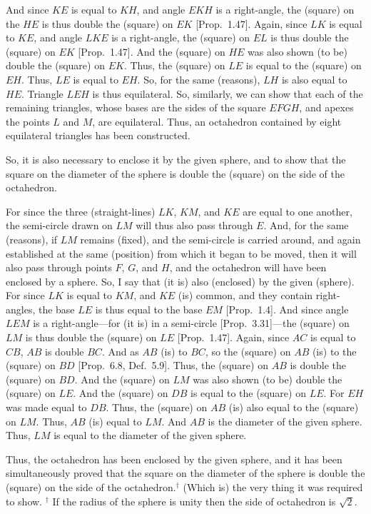 \epsfysize=3.25in
\centerline{}

And since  $KE$ is equal to $KH$, and angle $EKH$ is a right-angle, 
the (square) on the  $HE$ is thus double the (square) on $EK$ [Prop.~1.47].
Again, since $LK$ is equal to $KE$, and angle $LKE$
is a right-angle, the (square) on $EL$ is thus double the (square) on
$EK$ [Prop.~1.47]. And the (square) on $HE$ was also shown (to be)
double the (square) on $EK$.  Thus, the (square) on $LE$
is equal to the (square) on $EH$. Thus, $LE$ is equal to $EH$. So,
for the same (reasons), $LH$ is also equal to $HE$. Triangle
$LEH$ is thus equilateral. So, similarly, we can show that each of
the remaining triangles, whose bases are the sides of the
square $EFGH$, and apexes the points $L$ and $M$, are equilateral.
Thus, an octahedron contained by eight
equilateral triangles has been constructed.

So, it is also necessary to enclose it by the given sphere, and to show that the
square on the diameter of the sphere is double the (square) on the
side of the octahedron.

For since the three (straight-lines) $LK$, $KM$, and $KE$ are equal
to one another, the semi-circle drawn on $LM$ will thus also pass
through $E$. And, for the same (reasons), if $LM$ remains (fixed), and the semi-circle is carried around, and again established at the same
(position) from which it began to be moved, then it will also pass
through points $F$, $G$, and $H$, and the octahedron will have been
enclosed by a sphere. So, I say that (it is) also (enclosed)
by the given (sphere). For since $LK$ is equal to $KM$, and $KE$
(is) common, and they contain right-angles, the base
$LE$ is thus equal to the base $EM$ [Prop.~1.4]. And since angle $LEM$
is a right-angle---for (it is) in a semi-circle [Prop.~3.31]---the
(square) on $LM$ is thus double the (square) on $LE$ [Prop.~1.47]. 
Again, since $AC$ is equal to $CB$, $AB$ is double $BC$. 
And as $AB$ (is) to $BC$, so the (square) on $AB$ (is) to the
(square) on $BD$ [Prop.~6.8, Def.~5.9]. Thus, the (square) on 
$AB$ is double the (square) on $BD$. And the (square) on $LM$
was also shown (to be) double the (square) on $LE$. And the (square)
on $DB$ is equal to the (square) on $LE$. For $EH$ was made equal
to $DB$. Thus, the (square) on $AB$ (is) also equal to the (square) on 
$LM$. Thus, $AB$ (is) equal to $LM$. And $AB$ is the diameter of the
given sphere. Thus, $LM$ is equal to the diameter of the given sphere.

Thus, the octahedron has been enclosed by the given sphere,  and it has
been simultaneously  proved that the square on the diameter of the sphere
is double the (square) on the side of the octahedron.$^\dag$ (Which is) the
very thing it was required to show.
{\footnotesize\noindent$^\dag$ If the radius of the sphere is unity then the
side of octahedron is $\sqrt{2}$.}

